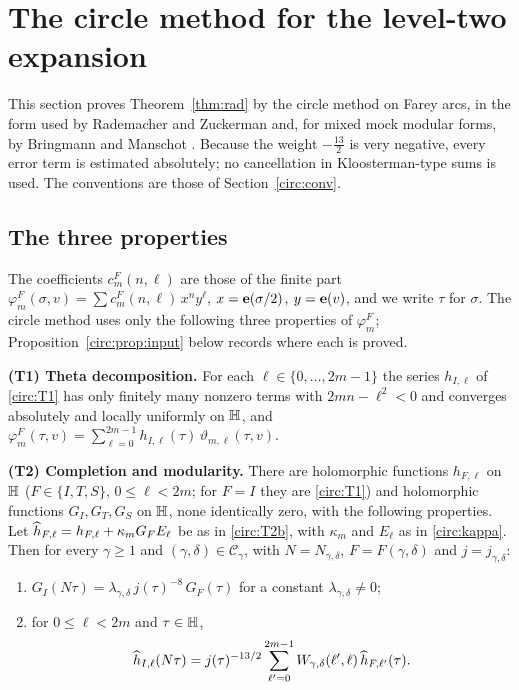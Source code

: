 \section{The circle method for the level-two expansion}\label{circ:sec}

This section proves Theorem~\ref{thm:rad} by the circle method on Farey arcs, in the form used by Rademacher and Zuckerman \cite{RZ38,Zuc39} and, for mixed mock modular forms, by Bringmann and Manschot \cite{BMa13}. Because the weight $-\frac{13}{2}$ is very negative, every error term is estimated absolutely; no cancellation in Kloosterman-type sums is used. The conventions are those of Section~\ref{circ:conv}.

\subsection{The three properties}\label{circ:input}
The coefficients $c^F_m(n,\ell)$ are those of the finite part $\varphi^F_m(\sigma,v)=\sum c^F_m(n,\ell)\,x^ny^\ell$, $x=\mathbf e(\sigma/2)$, $y=\mathbf e(v)$, and we write $\tau$ for $\sigma$. The circle method uses only the following three properties of $\varphi^F_m$; Proposition~\ref{circ:prop:input} below records where each is proved.

\medskip\noindent\textbf{(T1) Theta decomposition.} For each $\ell\in\{0,\dots,2m-1\}$ the series $h_{I,\ell}$ of \eqref{circ:T1} has only finitely many nonzero terms with $2mn-\ell^2<0$ and converges absolutely and locally uniformly on $\mathbb{H}$, and $\varphi^F_m(\tau,v)=\sum_{\ell=0}^{2m-1}h_{I,\ell}(\tau)\,\vartheta_{m,\ell}(\tau,v)$.

\medskip\noindent\textbf{(T2) Completion and modularity.} There are holomorphic functions $h_{F,\ell}$ on $\mathbb{H}$ ($F\in\{I,T,S\}$, $0\le\ell<2m$; for $F=I$ they are \eqref{circ:T1}) and holomorphic functions $G_I,G_T,G_S$ on $\mathbb{H}$, none identically zero, with the following properties. Let $\widehat h_{F,\ell}=h_{F,\ell}+\kappa_mG_FE_\ell$ be as in \eqref{circ:T2b}, with $\kappa_m$ and $E_\ell$ as in \eqref{circ:kappa}. Then for every $\gamma\ge1$ and $(\gamma,\delta)\in\mathcal C_\gamma$, with $N=N_{\gamma,\delta}$, $F=F(\gamma,\delta)$ and $j=j_{\gamma,\delta}$:
\begin{enumerate}
\item[(T2a)] $G_I(N\tau)=\lambda_{\gamma,\delta}\,j(\tau)^{-8}\,G_F(\tau)$ for a constant $\lambda_{\gamma,\delta}\ne0$;
\item[(T2b)] for $0\le\ell<2m$ and $\tau\in\mathbb{H}$,
\begin{equation}\label{circ:T2}
\widehat h_{I,\ell}(N\tau)=j(\tau)^{-13/2}\sum_{\ell'=0}^{2m-1}W_{\gamma,\delta}(\ell',\ell)\,\widehat h_{F,\ell'}(\tau).
\end{equation}
\end{enumerate}

